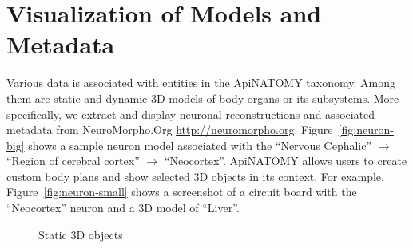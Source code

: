 \section{Visualization of Models and Metadata} \label{sect:visualization2}               %

Various data is associated with entities in the ApiNATOMY taxonomy. 
Among them are static and dynamic 3D models of body organs or its subsystems. 
More specifically, we extract and display neuronal reconstructions and associated metadata from NeuroMorpho.Org \url{http://neuromorpho.org}.
Figure~\ref{fig:neuron-big} shows a sample neuron model associated with the ``Nervous Cephalic'' $\rightarrow$ ``Region of cerebral cortex'' $\rightarrow$ ``Neocortex''. ApiNATOMY allows users to create custom body plans and show selected 3D objects in its context. For example, Figure~\ref{fig:neuron-small} shows a screenshot of a circuit board with the ``Neocortex'' neuron and a 3D model of ``Liver''.

\begin{figure}
\centering
  \caption{Static 3D objects}
  \label{fig:neurons}
\end{figure}

